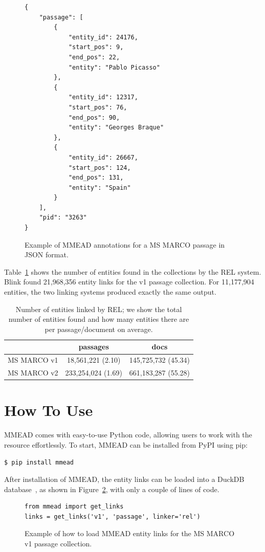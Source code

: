 \begin{figure}
	\begin{verbatim}
{
	"passage": [
		{
			"entity_id": 24176,
			"start_pos": 9,
			"end_pos": 22,
			"entity": "Pablo Picasso"
		},
		{
			"entity_id": 12317, 
			"start_pos": 76, 
			"end_pos": 90, 
			"entity": "Georges Braque"
		},
		{
			"entity_id": 26667,
			"start_pos": 124,
			"end_pos": 131,
			"entity": "Spain"
		}
	], 
	"pid": "3263"
}
	\end{verbatim}
\caption{Example of MMEAD annotations for a MS MARCO passage in JSON format.}
\label{fig:json-example-passage-v1}
\end{figure}

Table~\ref{number-links} shows the number of entities found in the collections by the REL system. Blink found 21,968,356 entity links for the v1 passage collection.  For 11,177,904 entities, the two linking systems produced exactly the same output. 

\begin{table}
\centering
\caption{Number of entities linked by REL; we show the total number of entities found and how many entities there are per passage/document on average.}
\begin{tabular}{c|c|c}
	\toprule
	& passages & docs \\
	\midrule
	MS MARCO v1 & 18,561,221 (2.10) & 145,725,732 (45.34) \\
	MS MARCO v2 & 233,254,024 (1.69) & 661,183,287 (55.28) \\
	\bottomrule
\end{tabular}
\label{number-links}
\end{table}

\section{How To Use}

MMEAD comes with easy-to-use Python code, allowing users to work with the resource effortlessly. To start, MMEAD can be installed from PyPI using pip:

\begin{verbatim}
$ pip install mmead
\end{verbatim}

After installation of MMEAD, the entity links can be loaded into a DuckDB database~\citep{duckdb}, as shown in Figure~\ref{fig:load-links}, with only a couple of lines of code.

\begin{figure}
\begin{verbatim}
from mmead import get_links
links = get_links('v1', 'passage', linker='rel')
\end{verbatim}
\caption{Example of how to load MMEAD entity links for the MS MARCO v1 passage collection.}
\label{fig:load-links}
\end{figure}

